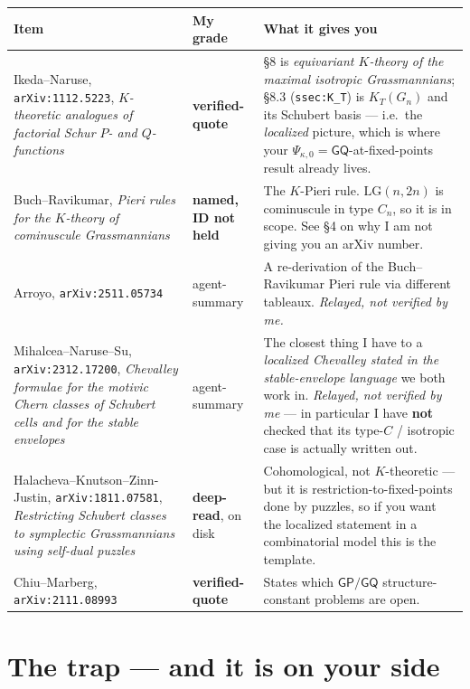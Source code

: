 \documentclass[11pt]{article}
\newcommand{\LG}{\mathrm{LG}}
\newcommand{\GP}{\mathsf{GP}}
\newcommand{\GQ}{\mathsf{GQ}}
\begin{document}
\begin{center}
\begin{tabular}{@{}llp{6.2cm}@{}}
\toprule
\textbf{Item} & \textbf{My grade} & \textbf{What it gives you} \\
\midrule
Ikeda--Naruse, \texttt{arXiv:1112.5223},
\emph{$K$-theoretic analogues of factorial Schur $P$- and $Q$-functions}
& \textbf{verified-quote} & \S8 is \emph{equivariant $K$-theory of the maximal
isotropic Grassmannians}; \S8.3 (\texttt{ssec:K\_T}) is $K_T(G_n)$ and its Schubert
basis --- i.e.\ the \emph{localized} picture, which is where your
$\Psi_{\kappa,0} = \GQ$-at-fixed-points result already lives. \\
\addlinespace
Buch--Ravikumar, \emph{Pieri rules for the $K$-theory of cominuscule Grassmannians}
& \textbf{named, ID not held} & The $K$-Pieri rule. $\LG(n,2n)$ is cominuscule in
type $C_n$, so it is in scope. See \S4 on why I am not giving you an arXiv number. \\
\addlinespace
Arroyo, \texttt{arXiv:2511.05734}
& agent-summary & A re-derivation of the Buch--Ravikumar Pieri rule via different
tableaux. \emph{Relayed, not verified by me.} \\
\addlinespace
Mihalcea--Naruse--Su, \texttt{arXiv:2312.17200},
\emph{Chevalley formulae for the motivic Chern classes of Schubert cells and for the
stable envelopes}
& agent-summary & The closest thing I have to a \emph{localized Chevalley stated in
the stable-envelope language} we both work in. \emph{Relayed, not verified by me} ---
in particular I have \textbf{not} checked that its type-$C$ / isotropic case is
actually written out. \\
\addlinespace
Halacheva--Knutson--Zinn-Justin, \texttt{arXiv:1811.07581},
\emph{Restricting Schubert classes to symplectic Grassmannians using self-dual puzzles}
& \textbf{deep-read}, on disk & Cohomological, not $K$-theoretic --- but it is
restriction-to-fixed-points done by puzzles, so if you want the localized statement in
a combinatorial model this is the template. \\
\addlinespace
Chiu--Marberg, \texttt{arXiv:2111.08993} & \textbf{verified-quote} & States which
$\GP/\GQ$ structure-constant problems are open. \\
\bottomrule
\end{tabular}
\end{center}

\section{The trap --- and it is on your side}
\end{document}
